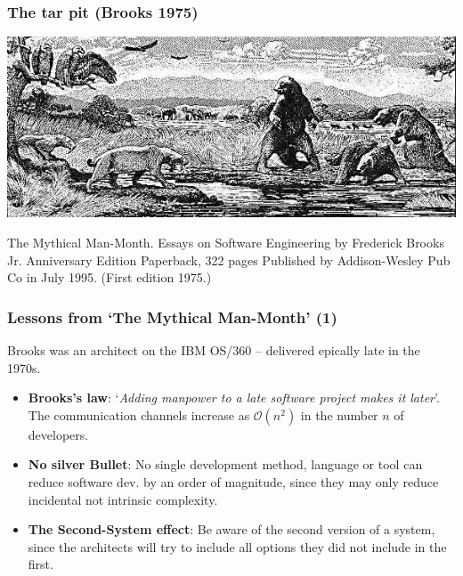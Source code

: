 \documentclass{beamer} %
\newcommand\emc[1]{\textcolor{brightblue}{\textbf{#1}}}
\begin{document}
\begin{frame}
\frametitle{The tar pit (Brooks 1975)}

\begin{center}
\includegraphics[scale=0.5]{assets/tar-pit}
\end{center}

{\small The Mythical Man-Month. Essays on Software Engineering by Frederick Brooks Jr. Anniversary Edition  Paperback, 322 pages Published by Addison-Wesley Pub Co in July 1995. (First edition 1975.)}

\end{frame}

\begin{frame}
\frametitle{Lessons from `The Mythical Man-Month' (1)}

Brooks was an architect on the IBM OS/360 -- delivered epically late in the 1970s.
\begin{itemize}
  \item  \emc{Brooks's law}: `\emph{Adding manpower to a late software project makes it later}'. The communication channels increase as $\mathcal{O}(n^2)$ in the number $n$ of developers.
  \item \emc{No silver Bullet}: No single development method, language or tool can reduce software dev. by an order of magnitude, since they may only reduce incidental not intrinsic complexity.
  \item \emc{The Second-System effect}: Be aware of the second version of a system, since the architects will try to include all options they did not include in the first.
\end{itemize}

\end{frame}
\end{document}

